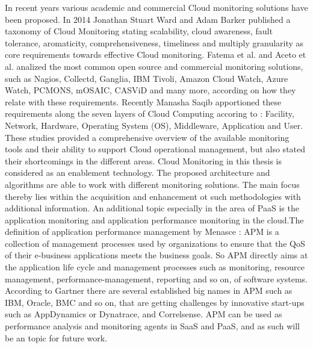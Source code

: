 In recent years various academic and commercial Cloud monitoring solutions have been proposed. In 2014 Jonathan Stuart Ward and Adam Barker  \cite{ward2014observing} published a taxonomy of Cloud Monitoring stating scalability, cloud awareness, fault tolerance, aromaticity, comprehensiveness, timeliness and multiply granularity as core requirements towards effective Cloud monitoring. Fatema et al.  \cite{fatema2014survey} and Aceto et al.  \cite{aceto2013cloud} analized the most common open source and commercial monitoring solutions, such as Nagios, Collectd, Ganglia, IBM Tivoli, Amazon Cloud Watch, Azure Watch, PCMONS, mOSAIC, CASViD and many more, according on how they relate with these requirements. Recently Manasha Saqib  \cite{saqib2017cloud} apportioned these requirements along the seven layers of Cloud Computing accoring to  \cite{CSA3.0}  \cite{spring2011monitoring1}  \cite{spring2011monitoring2}: Facility, Network, Hardware, Operating System (OS), Middleware, Application and User. These studies provided a comprehensive overview of the available monitoring tools and their ability to support Cloud operational management, but also stated their shortcomings in the different areas. Cloud Monitoring in this thesis is considered as an enablement technology. The proposed architecture and algorithms are able to work with different monitoring solutions. The main focus thereby lies within the acquisition and enhancement ot such methodologies with additional information.
An additional topic especially in the area of PaaS is the application monitoring and application performance monitoring in the cloud.The definition of application performance management by Menasce  \cite{menasce2002load}: APM is a collection of management processes used by organizations to ensure that the QoS of their e-business applications meets the business goals. So APM directly aims at the application life cycle and management processes such as monitoring, resource management, performance-management, reporting and so on, of software systems. According to Gartner  \cite{GartnerAPM} there are several established big names in APM such as IBM, Oracle, BMC and so on, that are getting challenges by innovative start-ups such as AppDynamics or Dynatrace, and Correlsense. APM can be used as performance analysis and monitoring agents in SaaS and PaaS, and as such will be an topic for future work.


